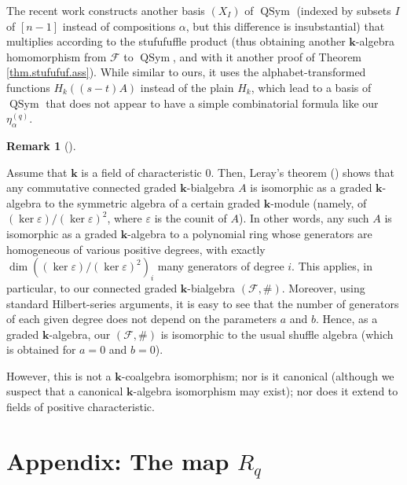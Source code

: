 \documentclass[numbers=enddot,12pt,final,onecolumn,notitlepage]{scrartcl}%
\theoremstyle{definition}
\newtheorem{remk}[theo]{Remark}
\newenvironment{remark}[1][]
{\begin{remk}[#1]\begin{leftbar}}
{\end{leftbar}\end{remk}}
\begin{document}
The recent work \cite[Theorem 5.2]{BoNoTh22} constructs another basis $\left(
X_{I}\right)  $ of $\operatorname*{QSym}$ (indexed by subsets $I$ of $\left[
n-1\right]  $ instead of compositions $\alpha$, but this difference is
insubstantial) that multiplies according to the stufufuffle product (thus
obtaining another $\mathbf{k}$-algebra homomorphism from $\mathcal{F}$ to
$\operatorname*{QSym}$, and with it another proof of Theorem
\ref{thm.stufufuf.ass}). While similar to ours, it uses the
alphabet-transformed functions $H_{k}\left(  \left(  s-t\right)  A\right)  $
instead of the plain $H_{k}$, which lead to a basis of $\operatorname*{QSym}$
that does not appear to have a simple combinatorial formula like our
$\eta_{\alpha}^{\left(  q\right)  }$.

\begin{remark}
Assume that $\mathbf{k}$ is a field of characteristic $0$. Then, Leray's
theorem (\cite[Theorem 1.7.29(f)]{GriRei}) shows that any commutative
connected graded $\mathbf{k}$-bialgebra $A$ is isomorphic as a graded
$\mathbf{k}$-algebra to the symmetric algebra of a certain graded $\mathbf{k}%
$-module (namely, of $\left( \ker\varepsilon\right)  / \left( \ker
\varepsilon\right) ^{2}$, where $\varepsilon$ is the counit of $A$). In other
words, any such $A$ is isomorphic as a graded $\mathbf{k}$-algebra to a
polynomial ring whose generators are homogeneous of various positive degrees,
with exactly $\dim\left( \left( \ker\varepsilon\right)  / \left(
\ker\varepsilon\right) ^{2}\right) _{i}$ many generators of degree $i$. This
applies, in particular, to our connected graded $\mathbf{k}$-bialgebra
$\left(  \mathcal{F},\#\right)  $. Moreover, using standard Hilbert-series
arguments, it is easy to see that the number of generators of each given
degree does not depend on the parameters $a$ and $b$. Hence, as a graded
$\mathbf{k}$-algebra, our $\left(  \mathcal{F},\#\right)  $ is isomorphic to
the usual shuffle algebra (which is obtained for $a=0$ and $b=0$).

However, this is not a $\mathbf{k}$-coalgebra isomorphism; nor is it canonical
(although we suspect that a canonical $\mathbf{k}$-algebra isomorphism may
exist); nor does it extend to fields of positive characteristic.
\end{remark}

\section{\label{sec.Rq}Appendix: The map $R_{q}$}
\end{document}
